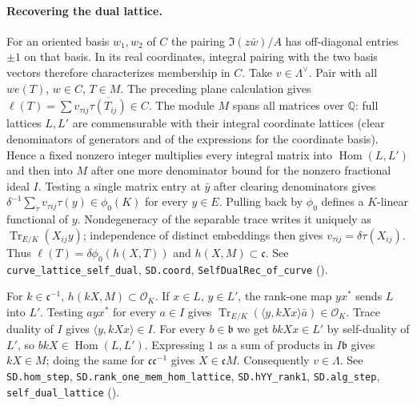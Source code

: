 \paragraph{Recovering the dual lattice.}\label{r14:lat-dual}
For an oriented basis $w_1,w_2$ of $C$ the pairing
$\Im(z\bar w)/A$ has off-diagonal entries $\pm1$ on that basis.
In its real coordinates, integral pairing with the two basis vectors
therefore characterizes membership in $C$. Take $v\in\Lambda^\vee$.
Pair with all $w e(T)$, $w\in C$, $T\in M$. The preceding plane
calculation gives
$\ell(T)=\sum v_{\tau ij}\overline{\tau(T_{ij})}\in C$.
The module $M$ spans all matrices over $\mathbb Q$: full lattices $L,L'$
are commensurable with their integral coordinate lattices (clear denominators
of generators and of the expressions for the coordinate basis). Hence a
fixed nonzero integer multiplies every integral matrix into
$\operatorname{Hom}(L,L')$ and then into $M$ after one more denominator
bound for the nonzero fractional ideal $I$. Testing a single matrix entry at
$\bar y$ after clearing denominators gives
$\delta^{-1}\sum_\tau v_{\tau ij}\tau(y)\in\phi_0(K)$ for every $y\in E$.
Pulling back by $\phi_0$ defines a $K$-linear functional of $y$.
Nondegeneracy of the separable trace writes it uniquely as
$\operatorname{Tr}_{E/K}(X_{ij}y)$; independence of distinct embeddings
then gives $v_{\tau ij}=\delta\tau(X_{ij})$.
Thus $\ell(T)=\delta\phi_0(h(X,T))$ and $h(X,M)\subset\mathfrak c$.
See \nolinkurl{curve_lattice_self_dual}, \nolinkurl{SD.coord},
\nolinkurl{SelfDualRec_of_curve}
().

For $k\in\mathfrak c^{-1}$, $h(kX,M)\subset\mathcal O_K$.
If $x\in L$, $y\in L'$, the rank-one map $yx^*$ sends $L$ into $L'$.
Testing $a yx^*$ for every $a\in I$ gives
$\operatorname{Tr}_{E/K}(\langle y,kXx\rangle\bar a)\in\mathcal O_K$.
Trace duality of $I$ gives $\langle y,kXx\rangle\in I$.
For every $b\in\mathfrak b$ we get $bkXx\in L'$ by self-duality of $L'$,
so $bkX\in\operatorname{Hom}(L,L')$. Expressing $1$ as a sum of
products in $I\mathfrak b$ gives $kX\in M$; doing the same for
$\mathfrak c\mathfrak c^{-1}$ gives $X\in\mathfrak c M$. Consequently
$v\in\Lambda$. See \nolinkurl{SD.hom_step}, \nolinkurl{SD.rank_one_mem_hom_lattice},
\nolinkurl{SD.hYY_rank1}, \nolinkurl{SD.alg_step}, \nolinkurl{self_dual_lattice}
().

